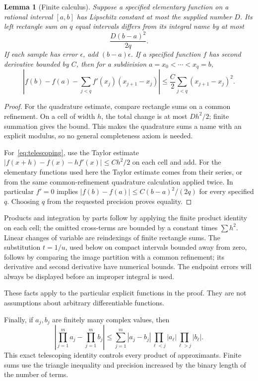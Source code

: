 \documentclass[11pt,letterpaper]{article}
\numberwithin{equation}{section}
\newtheorem{lemma}[theorem]{Lemma}
\theoremstyle{definition}
\begin{document}
\begin{lemma}[Finite calculus]\label{lem:finitecalculus}
Suppose a specified elementary function on a rational interval
\([a,b]\) has Lipschitz constant at most the supplied number \(D\).
Its left rectangle sum on \(q\) equal intervals differs from its
integral name by at most
\[
              \frac{D(b-a)^2}{2q}.
\]
If each sample has error \(\epsilon\), add \((b-a)\epsilon\).
If a specified function \(f\) has second derivative bounded by \(C\),
then for a subdivision \(a=x_0<\cdots<x_q=b\),
\begin{equation}
 \left|f(b)-f(a)-\sum_{j<q}f'(x_j)(x_{j+1}-x_j)\right|
       \le \frac C2\sum_{j<q}(x_{j+1}-x_j)^2.               \label{eq:telescoping}
\end{equation}
\end{lemma}

\begin{proof}
For the quadrature estimate, compare rectangle sums on a common
refinement. On a cell of width \(h\), the total change is at most
\(D h^2/2\); finite summation gives the bound. This makes the
quadrature sums a name with an explicit modulus, so no general
completeness axiom is needed.

For~\eqref{eq:telescoping}, use the Taylor estimate
\(|f(x+h)-f(x)-hf'(x)|\le Ch^2/2\) on each cell and add.
For the elementary functions used here the Taylor estimate comes
from their series, or from the same common-refinement quadrature
calculation applied twice. In particular \(f'=0\) implies
\(|f(b)-f(a)|\le C(b-a)^2/(2q)\) for every specified \(q\).
Choosing \(q\) from the requested precision proves equality.
\end{proof}

Products and integration by parts follow by applying the finite product
identity on each cell; the omitted cross-terms are bounded by a constant
times \(\sum h^2\). Linear changes of variable are reindexings of
finite rectangle sums. The substitution \(t=1/u\), used below on
compact intervals bounded away from zero, follows by comparing the
image partition with a common refinement; its derivative and second
derivative have numerical bounds. The endpoint errors will always
be displayed before an improper integral is used.

These facts apply to the particular explicit functions in the proof.
They are not assumptions about arbitrary differentiable functions.

Finally, if \(a_j,b_j\) are finitely many complex values, then
\begin{equation}
 \left|\prod_{j=1}^m a_j-\prod_{j=1}^m b_j\right|
 \le \sum_{j=1}^m |a_j-b_j|
          \prod_{\ell<j}|a_\ell|\prod_{\ell>j}|b_\ell|.
 \label{eq:producterror}
\end{equation}
This exact telescoping identity controls every product of
approximants. Finite sums use the triangle inequality and precision
increased by the binary length of the number of terms.
\end{document}
